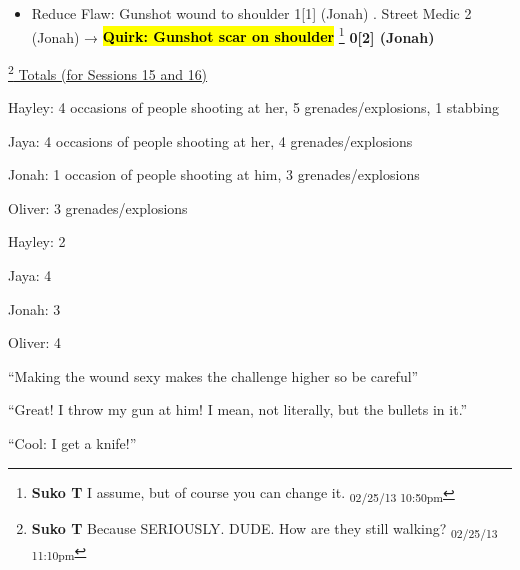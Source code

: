 \begin{itemize}
\item  {\color[RGB]{255,0,0}Reduce Flaw: }  {\color[RGB]{255,0,0}Gunshot wound to shoulder}  {\color[RGB]{255,0,0} 1{[}1{]} (Jonah)} .  Street Medic 2 (Jonah) → \textbf{ {\color[RGB]{255,0,0}\hl{Quirk: Gunshot scar on shoulder}} }\footnote{\textbf{Suko T }I assume, but of course you can change it. \textsubscript{02/25/13 10:50pm}}\textbf{ {\color[RGB]{255,0,0}0{[}2{]} (Jonah)} }
\end{itemize}


\footnote{\textbf{Suko T }Because SERIOUSLY.  DUDE.  How are they still walking? \textsubscript{02/25/13 11:10pm}}\underline{  Totals (for Sessions 15 and 16) }

Hayley: 4 occasions of people shooting at her, 5 grenades/explosions, 1 stabbing

Jaya: 4 occasions of people shooting at her, 4 grenades/explosions

Jonah: 1 occasion of people shooting at him,  3 grenades/explosions

Oliver: 3 grenades/explosions




{
\parskip=0pt
Hayley: 2

Jaya: 4

Jonah: 3

Oliver: 4
}





``Making the wound sexy makes the challenge higher so be careful''




``Great!  I throw my gun at him!  I mean, not literally, but the bullets in it.''






``Cool: I get a knife!''



